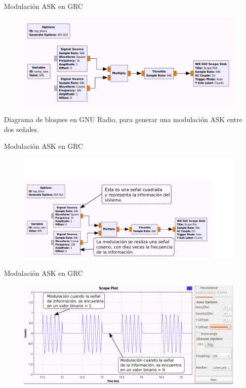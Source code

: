 \begin{frame}{Modulación ASK en GRC}

\begin{figure}[H]
\centering
\includegraphics[width=\textwidth]{parte1/lab4/pdf/lab4_1.pdf}
\end{figure}
Diagrama de bloques en GNU Radio, para generar una modulación ASK entre dos señales.
\end{frame}

\begin{frame}{Modulación ASK en GRC}
\vspace{-1cm}
\begin{figure}[H]
\centering
\includegraphics[width=1.1\textwidth]{parte1/lab4/pdf/lab4_2.pdf}
\end{figure}
\end{frame}

\begin{frame}{Modulación ASK en GRC}
\vspace{-1.5cm}
\begin{figure}[H]
\centering
\includegraphics[width=1.1\textwidth]{parte1/lab4/pdf/lab4_3.pdf}
\end{figure}
\end{frame}

